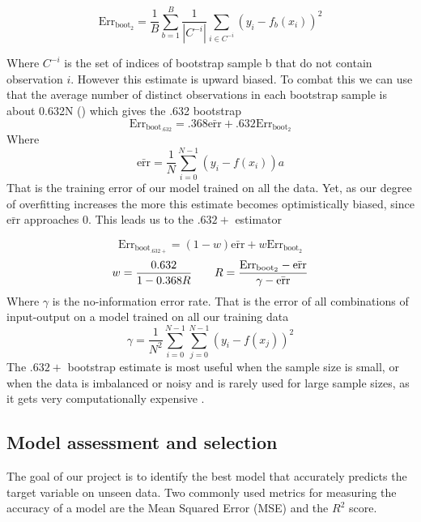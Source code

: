 \documentclass{article}
\begin{document}
\begin{equation*}
    \text{Err}_{\text{boot}_2} =  \frac{1}{B} \sum_{b=1}^B \frac{1}{|C^{-i}|} \sum_{i \in C^{-i}} (y_i - f_b(x_i))^2
\end{equation*}

Where $C^{-i}$ is the set of indices of bootstrap sample b that do not contain
observation $i$. However this estimate is upward biased. To combat this we can use that the average number of distinct observations in each bootstrap sample is about 0.632N (\cite[p.~270]{Hastie2009}) which gives the .632 bootstrap
\begin{equation*}
    \text{Err}_{\text{boot}_{.632}} = .368\bar{\text{err}} + .632 \text{Err}_{\text{boot}_2}
\end{equation*}
Where
\begin{equation*}
    \bar{\text{err}} = \frac{1}{N} \sum_{i=0}^{N-1} (y_i - f(x_i))a
\end{equation*}
That is the training error of our model trained on all the data. Yet, as our degree of overfitting increases the more this estimate becomes optimistically biased, since $\bar{\text{err}}$ approaches 0.
This leads us to the $.632+$ estimator

\begin{equation*}
    \text{Err}_{\text{boot}_{.632+}} = (1-w)\bar{\text{err}} + w \text{Err}_{\text{boot}_2}
\end{equation*}
\begin{equation*}
    w  = \frac{0.632}{1-0.368R} \hspace{7mm} R = \frac{\text{Err}_{\text{boot}_2}- \bar{\text{err}}}{\gamma - \bar{\text{err}}}
\end{equation*}
Where $\gamma$ is the no-information error rate. That is the error of all combinations of input-output on a model trained on all our training data
\begin{equation*}
    \gamma = \frac{1}{N^2} \sum_{i= 0}^{N-1}\sum_{j = 0}^{N-1} (y_i - f(x_j))^2
\end{equation*}
The $.632+$ bootstrap estimate is most useful when the sample size is small, or when the data is imbalanced or noisy and is rarely used for large sample sizes, as it gets very computationally expensive \cite[p.~271]{Hastie2009}.

\subsection{Model assessment and selection}
The goal of our project is to identify the best model that accurately predicts the target variable on unseen data. Two commonly used metrics for measuring the accuracy of a model are the Mean Squared Error (MSE) and the $R^2$ score.
\end{document}
